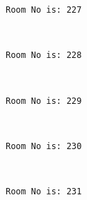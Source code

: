 \documentclass[11pt]{article}
\begin{document}
    \begin{Verbatim}[commandchars=\\\{\}]
Room No is: 227

    \end{Verbatim}

    \begin{center}
    \end{center}
    { \hspace*{\fill} \\}
    
    \begin{Verbatim}[commandchars=\\\{\}]
Room No is: 228

    \end{Verbatim}

    \begin{center}
    \end{center}
    { \hspace*{\fill} \\}
    
    \begin{Verbatim}[commandchars=\\\{\}]
Room No is: 229

    \end{Verbatim}

    \begin{center}
    \end{center}
    { \hspace*{\fill} \\}
    
    \begin{Verbatim}[commandchars=\\\{\}]
Room No is: 230

    \end{Verbatim}

    \begin{center}
    \end{center}
    { \hspace*{\fill} \\}
    
    \begin{Verbatim}[commandchars=\\\{\}]
Room No is: 231

    \end{Verbatim}
\end{document}
